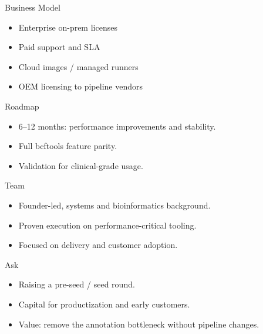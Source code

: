 \documentclass[aspectratio=169]{beamer}
\begin{document}
\begin{frame}{Business Model}
\begin{itemize}
  \item Enterprise on-prem licenses
  \item Paid support and SLA
  \item Cloud images / managed runners
  \item OEM licensing to pipeline vendors
\end{itemize}
\end{frame}

\begin{frame}{Roadmap}
\begin{itemize}
  \item 6--12 months: performance improvements and stability.
  \item Full bcftools feature parity.
  \item Validation for clinical-grade usage.
\end{itemize}
\end{frame}

\begin{frame}{Team}
\begin{itemize}
  \item Founder-led, systems and bioinformatics background.
  \item Proven execution on performance-critical tooling.
  \item Focused on delivery and customer adoption.
\end{itemize}
\end{frame}

\begin{frame}{Ask}
\begin{itemize}
  \item Raising a pre-seed / seed round.
  \item Capital for productization and early customers.
  \item Value: remove the annotation bottleneck without pipeline changes.
\end{itemize}
\end{frame}
\end{document}
